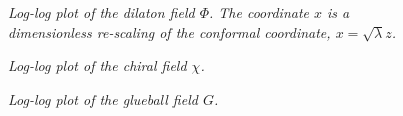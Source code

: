 \documentclass[12pt]{article}
\begin{document}
\begin{figure}[htb]
\caption{\textit{Log-log plot of the dilaton field $\Phi$. 
The coordinate $x$ is a dimensionless re-scaling of the conformal coordinate, $x=\sqrt{\lambda}z$.}}
\label{figDilaton}
\end{figure}

\begin{figure}[htb]
\caption{\textit{Log-log plot of the chiral field $\chi$. }}
\label{figChiral}
\end{figure}

\begin{figure}[htb]
\caption{\textit{Log-log plot of the glueball field $G$.}}
\label{figGlueball}
\end{figure}
\end{document}
